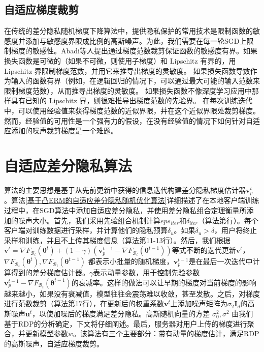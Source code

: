 \subsection{自适应梯度裁剪}
在传统的差分隐私随机梯度下降算法中，提供隐私保护的常用技术是限制函数的敏感度并添加与敏感度界限成比例的高斯噪声。为此，我们需要在每一轮SGD上限制梯度的敏感性。Abadi等人提出通过梯度范数裁剪保证函数的敏感度有界。如果损失函数是可微的（如果不可微，则使用子梯度）和 Lipschitz 有界的，用Lipschitz 界限制梯度范数，并用它来推导出梯度的灵敏度。 如果损失函数导数作为输入的函数有界（例如，在逻辑回归的情况下，可以通过最大可能的输入范数来限制梯度范数），从而推导出梯度的灵敏度。 如果损失函数不像深度学习应用中那样具有已知的 Lipschitz 界，则很难推导出梯度范数的先验界。 在每次训练迭代中，可以使用经验值来获得梯度范数的近似界限，并在这个近似界限处裁剪梯度。 然而，经验值的可用性是一个强有力的假设，在没有经验值的情况下如何针对自适应添加的噪声裁剪梯度是一个难题。


\section{自适应差分隐私算法}
算法的主要思想是基于从先前更新中获得的信息迭代构建差分隐私梯度估计器$\mathbf{v}_{p}^{t}$。算法\ref{基于凸ERM的自适应差分隐私随机优化算法}详细描述了在本地客户端训练过程中，在SGD算法中添加自适应差分隐私，并使用差分隐私组合定理衡量所添加的噪声大小。首先，我们采用先验组合机制计算$eps_{iter}$和$\delta_{iter}$（算法第行）。每个客户端对训练数据进行采样，并计算他们的隐私预算$\delta_{u}$。如果$\delta_{u}>\delta$，用户将终止采样和训练，并且不上传其梯度信息（算法第11-13行）。然后，我们根据$\mathbf{v}^{t}=\nabla F_{\mathcal{B}_{t}}\left(\boldsymbol{\theta}^{t}\right)+(1-\gamma)\left(\mathbf{v}_{p}^{t-1}-\nabla F_{\mathcal{B}_{t}}\left(\boldsymbol{\theta}^{t-1}\right)\right)$等式不断的迭代更新$\mathbf{v}^{t}$，$\nabla F_{\mathcal{B}_{t}}\left(\boldsymbol{\theta}^{t}\right), \nabla F_{\mathcal{B}_{t}}\left(\boldsymbol{\theta}^{t-1}\right)$ 都表示小批量的随机梯度，$\mathbf{v}_{p}^{t-1}$是在最后一次迭代中计算得到的差分梯度估计器。$\gamma$表示动量参数，用于控制先验参数$\mathbf{v}_{p}^{t-1}-\nabla F_{\mathcal{B}_{t}}\left(\boldsymbol{\theta}^{t-1}\right)$的衰减率。这样的做法可以让早期的梯度对当前梯度的影响越来越小，如果没有衰减值，模型往往会震荡难以收敛，甚至发散。之后，对梯度进行范数裁剪（算法第17行），在更新后的权重系数$\mathbf{v}^{t}$上添加噪声矩阵为$\sigma_{2} \mathbf{I}_{d}$的高斯噪声$\mathbf{u}^{t}$，以使加噪后的梯度满足差分隐私。高斯随机向量的方差 $\sigma_{0}^{2}, \sigma^{2}$ 由我们基于RDP的分析确定，下文将仔细阐述。最后，服务器对用户上传的梯度进行聚合，并更新模型参数$w$。该算法有三个主要部分：带有动量的梯度估计，满足RDP的高斯噪声，自适应梯度裁剪。

